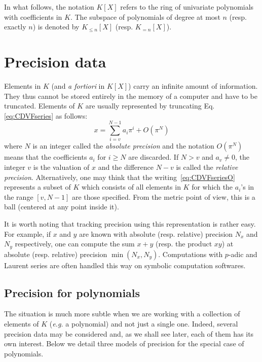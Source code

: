 \documentclass{sig-alternate-2013}
\begin{document}
In what follows, the notation $K[X]$ refers to the ring of univariate 
polynomials with coefficients in $K$. The subspace of polynomials of 
degree at most $n$ (resp. exactly $n$) is denoted by $K_{\leq n}[X]$ 
(resp. $K_{=n}[X]$).

\section{Precision data} \label{sec:prec_data}

Elements in $K$ (and \emph{a fortiori} in $K[X]$) carry an infinite 
amount of information. They thus cannot be stored entirely in the
memory of a computer and have to be truncated. Elements of $K$ are
usually represented by truncating Eq.\eqref{eq:CDVFseries} as
follows:
\begin{equation}
\label{eq:CDVFseriesO}
x = \sum_{i=v}^{N-1} a_i \pi^i + O(\pi^N)
\end{equation}
where $N$ is an integer called the \emph{absolute precision} and 
the notation $O(\pi^N)$ means that the coefficients $a_i$ for $i
\geq N$ are discarded. If $N > v$ and $a_v \neq 0$, the integer $v$ 
is the valuation of $x$ and the difference $N-v$ is called the
\emph{relative precision}.
Alternatively, one may think that the writing~\eqref{eq:CDVFseriesO}
represents a subset of $K$ which consists of all elements in $K$ for
which the $a_i$'s in the range $[v,N-1]$ are those specified. From the
metric point of view, this is a ball (centered at any point inside it).

It is worth noting that tracking precision using this representation is 
rather easy. For example, if $x$ and $y$ are known with absolute (resp. 
relative) precision $N_x$ and $N_y$ respectively, one can compute the 
sum $x+y$ (resp. the product $xy$) at absolute (resp. relative) 
precision $\min(N_x,N_y)$. Computations with $p$-adic and Laurent
series are often handled this way on symbolic computation softwares.

\subsection{Precision for polynomials}

The situation is much more subtle when we are working with a collection 
of elements of $K$ (\emph{e.g.} a polynomial) and not just a single one.
Indeed, several precision data may be considered and, as we shall see
later, each of them has its own interest. Below we detail three models 
of precision for the special case of polynomials.
\end{document}
